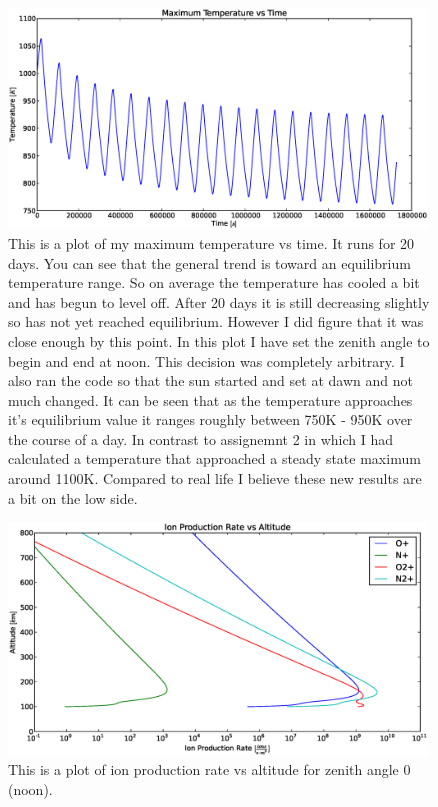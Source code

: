\documentclass[10pt]{article}
\begin{document}
\begin{figure}[H]
	\centering
		\includegraphics[width=0.99\textwidth]{./noon/A/T_max_vs_time.eps}
	\caption{This is a plot of my maximum temperature vs time. It runs for 20 days. You can see that the general trend is toward an equilibrium temperature range. So on average the temperature has cooled a bit and has begun to level off. After 20 days it is still decreasing slightly so has not yet reached equilibrium. However I did figure that it was close enough by this point. In this plot I have set the zenith angle to begin and end at noon. This decision was completely arbitrary. I also ran the code so that the sun started and set at dawn and not much changed. It can be seen that as the temperature approaches it's equilibrium value it ranges roughly between 750K - 950K over the course of a day. In contrast to assignemnt 2 in which I had calculated a temperature that approached a steady state maximum around 1100K. Compared to real life I believe these new results are a bit on the low side.}
	\label{fig:Tmax}
\end{figure}
\begin{figure}[H]
	\centering
		\includegraphics[width=0.99\textwidth]{./noon/B/Ion_Production_Rate_vs_Altitude_100_800.eps}
	\caption{This is a plot of ion production rate vs altitude for zenith angle $0$ (noon).}
	\label{fig:production1}
\end{figure}
\end{document}
